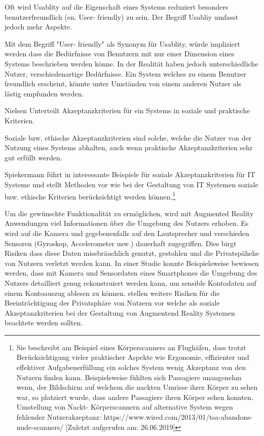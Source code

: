 \cite{Nielsen1994,RexHartson2012} Oft wird Usablity auf die Eigenschaft eines Systems reduziert besonders benutzerfreundlich (en. User- friendly) zu sein. Der Begriff Usabliy umfasst jedoch mehr Aspekte. 

\cite{Nielsen1994} Mit dem Begriff "User- friendly" als Synonym für Usablity, würde impliziert werden dass die Bedürfnisse von Benutzern mit nur einer Dimension eines Systems beschrieben werden könne. 
In der Realität haben jedoch unterschiedliche Nutzer, verschiedenartige Bedürfnisse. Ein System welches zu einem Benutzer freundlich erscheint, könnte unter Umständen von einem anderen Nutzer als 
lästig empfunden werden.

Nielsen \cite{Nielsen1994} Unterteilt Akzeptanzkriterien für ein Systems in soziale und praktische Kriterien.

Soziale bzw. ethische Akzeptanzkriterien sind solche, welche die Nutzer von der Nutzung eines Systems abhalten, auch wenn praktische Akzeptanzkriterien sehr gut erfüllt werden. 

Spiekermann führt in \cite[S.~285]{Spiekermann2016} interessante Beispiele für soziale Akzeptanzkriterien für IT Systeme und stellt Methoden vor wie bei der Gestaltung von IT Systemen 
soziale bzw. ethische Kriterien berücksichtigt werden können.\footnote{\cite[S.~285]{Spiekermann2016} Sie beschreibt am Beispiel eines Körperscanners an Flughäfen, dass trotzt  
Berücksichtigung vieler praktischer Aspekte wie Ergonomie, effizienter und effektiver Aufgabenerfüllung ein solches System wenig Akzeptanz von den Nutzern finden kann. 
Beispielsweise fühlten sich Passagiere unangenehm wenn, der Bildschirm auf welchem die nackten Umrisse ihrer Körper zu sehen war, so platziert wurde, dass andere Passagiere ihren Körper sehen konnten.
Umstellung von Nackt- Körperscannern auf alternative System wegen fehlender Nutzerakzeptanz: https://www.wired.com/2013/01/tsa-abandons-nude-scanners/ [Zuletzt aufgerufen am: 26.06.2019]}

Um die gewünschte Funktionalität zu ermöglichen, wird mit Augmented Reality Anwendungen viel Informationen über die Umgebung des Nutzers erhoben.\cite[S.~3]{Roesner2013} Es wird auf die Kamera und gegebenenfalls 
auf den Lautsprecher und verschieden Sensoren (Gyroskop, Accelerometer usw.) dauerhaft zugegriffen. Dies birgt Risiken dass diese Daten missbräuchlich genutzt, gestohlen und die Privatspähehe von Nutzern verletzt 
werden kann. \cite[S.~9]{Templeman2012} In einer Studie konnte Beispielsweise bewiesen werden, dass mit Kamera und Sensordaten eines Smartphones die Umgebung des Nutzers detailliert genug
rekonstruiert werden kann, um sensible Kontodaten auf einem Kontoauszug ablesen zu können. \cite{Roesner2013,Lebeck2018} stellen weitere Risiken für die Beeinträchtigung der Privatsphäre von Nutzern vor welche als 
soziale Akzeptanzkriterien bei der Gestaltung von Augmentend Reality Systemen beachtete werden sollten. 

